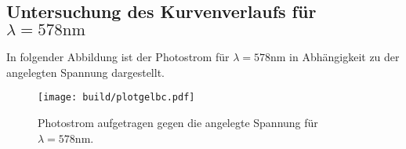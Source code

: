 \subsection{Untersuchung des Kurvenverlaufs für $\lambda = 578 \si{\nano\meter}$}
In folgender Abbildung ist der Photostrom für $\lambda = 578 \si{\nano\meter}$ in
Abhängigkeit zu der angelegten Spannung dargestellt.
\begin{figure}[H]
  \centering
  \texttt{[image: build/plotgelbc.pdf]}
  \label{fig:plotgelbc}
  \caption{Photostrom aufgetragen gegen die angelegte Spannung für $\lambda = 578 \si{\nano\meter}$.}
\end{figure}
\noindent
